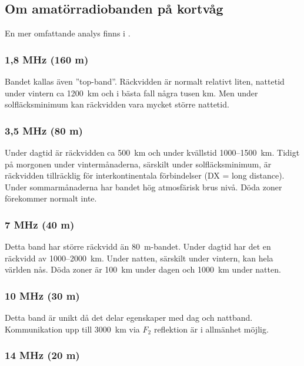 \subsection{Om amatörradiobanden på kortvåg}

En mer omfattande analys finns i \cite{ARRLHDB2015}.

\subsubsection{1,8 MHz (160 m)}

Bandet kallas även ''top-band''.
Räckvidden är normalt relativt liten, nattetid under vintern ca 1200~km och i
bästa fall några tusen km.
Men under solfläcksminimum kan räckvidden vara mycket större nattetid.

\subsubsection{3,5 MHz (80 m)}

Under dagtid är räckvidden ca 500~km och under kvällstid 1000--1500~km.
Tidigt på morgonen under vintermånaderna, särskilt under solfläcksminimum, är
räckvidden tillräcklig för interkontinentala förbindelser (DX = long distance).
Under sommarmånaderna har bandet hög atmosfärisk brus nivå.
Döda zoner förekommer normalt inte.

\subsubsection{7 MHz (40 m)}

Detta band har större räckvidd än 80~m-bandet.
Under dagtid har det en räckvidd av 1000--2000~km.
Under natten, särskilt under vintern, kan hela världen nås.
Döda zoner är 100~km under dagen och 1000~km under natten.

\subsubsection{10 MHz (30 m)}

Detta band är unikt då det delar egenskaper med dag och nattband.
Kommunikation upp till 3000~km via \(F_2\) reflektion är i allmänhet möjlig.

\subsubsection{14 MHz (20 m)}

